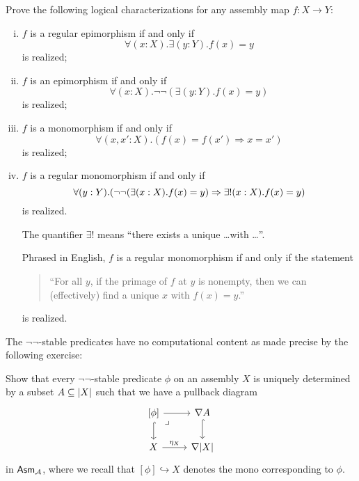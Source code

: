 \begin{exercise}\label{exer:epis-monos-logically}
  Prove the following logical characterizations for any assembly map \(f \colon X \to Y\):
  \begin{enumerate}[(i)]
  \item \(f\) is a regular epimorphism if and only if
    \[
      \forall(x : X).\exists(y : Y).f(x) = y
    \]
    is realized;
  \item \(f\) is an epimorphism if and only if
    \[
      \forall(x : X).\lnot\lnot({\exists(y : Y).f(x) = y})
    \]
    is realized;
  \item \(f\) is a monomorphism if and only if
    \[
      \forall(x, x' : X).(f(x) = f(x') \Rightarrow x = x')
    \]
    is realized;
  \item \(f\) is a regular monomorphism if and only if
    \[
      \forall(y : Y).\pa*{\lnot\lnot\pa*{\exists(x : X).f(x) = y} \Rightarrow \exists!(x : X).f(x) = y}
    \]
    is realized.

    The quantifier \(\exists!\) means ``there exists a unique \dots with \dots''.

    Phrased in English, \(f\) is a regular monomorphism if and only if the statement
    \begin{quote}{``For all \(y\), if the primage of \(f\) at \(y\) is nonempty,
        then we can (effectively) find a unique \(x\) with \(f(x) = y\).''}
    \end{quote}
    is realized.
  \end{enumerate}
\end{exercise}

The \(\lnot\lnot\)-stable predicates have no computational content as made
precise by the following exercise:

\begin{exercise}\label{exer:not-not-stable-nabla-pullback}
  Show that every \(\lnot\lnot\)-stable predicate \(\phi\) on an assembly \(X\)
  is uniquely determined by a subset \(A \subseteq \lvert X\rvert\) such that we
  have a pullback diagram
  \[
    \begin{tikzcd}
      {[\phi]} \ar[r] \ar[d,hookrightarrow] \pbcorner
      & \nabla A \ar[d,hookrightarrow] \\
      X \ar[r,"\eta_X"] & \nabla\carrier{X}
    \end{tikzcd}
  \]
  in \(\mathsf{Asm}_{\mathcal A}\), where we recall that \([\phi] \hookrightarrow X\) denotes
  the mono corresponding to \(\phi\).
\end{exercise}


